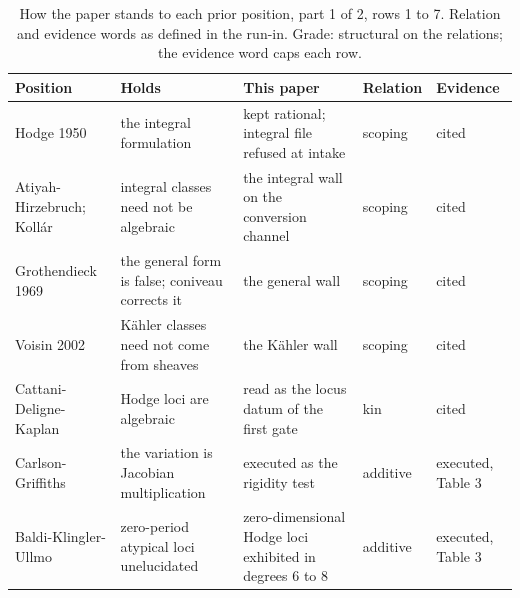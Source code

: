 \documentclass[10pt,twocolumn]{article}
\begin{document}
\begin{table}[tp]
\centering
\footnotesize
\setlength{\tabcolsep}{4pt}
\caption{How the paper stands to each prior position, part 1 of 2, rows 1 to 7. Relation and evidence words as defined in the run-\hspace{0pt}in. Grade: structural on the relations; the evidence word caps each row.}
\begin{tabular}{@{}>{\raggedright\arraybackslash\hspace{0pt}}p{}>{\raggedright\arraybackslash\hspace{0pt}}p{}>{\raggedright\arraybackslash\hspace{0pt}}p{}>{\raggedright\arraybackslash\hspace{0pt}}p{}>{\raggedright\arraybackslash\hspace{0pt}}p{}@{}}
\toprule
Position & Holds & This paper & Relation & Evidence \\
\midrule
Hodge 1950 \cite{hodge1950} & the integral formulation & kept rational; integral file refused at intake & scoping & cited \\
Atiyah-\hspace{0pt}Hirzebruch; Kollár \cite{ah1962,kollar1992} & integral classes need not be algebraic & the integral wall on the conversion channel & scoping & cited \\
Grothen\discretionary{-}{}{}dieck 1969 \cite{grothendieck1969} & the general form is false; coniveau corrects it & the general wall & scoping & cited \\
Voisin 2002 \cite{voisin2002} & Kähler classes need not come from sheaves & the Kähler wall & scoping & cited \\
Cattani-\hspace{0pt}Deligne-\hspace{0pt}Kaplan \cite{cdk1995} & Hodge loci are algebraic & read as the locus datum of the first gate & kin & cited \\
Carlson-\hspace{0pt}Griffiths \cite{cg1980} & the variation is Jacobian multiplication & executed as the rigidity test & additive & executed, Table 3 \\
Baldi-\hspace{0pt}Klingler-\hspace{0pt}Ullmo \cite{bku2024} & zero-\hspace{0pt}period atypical loci unelucidated & zero-\hspace{0pt}dimensional Hodge loci exhibited in degrees 6 to 8 & additive & executed, Table 3 \\
\bottomrule
\end{tabular}
\end{table}
\end{document}
